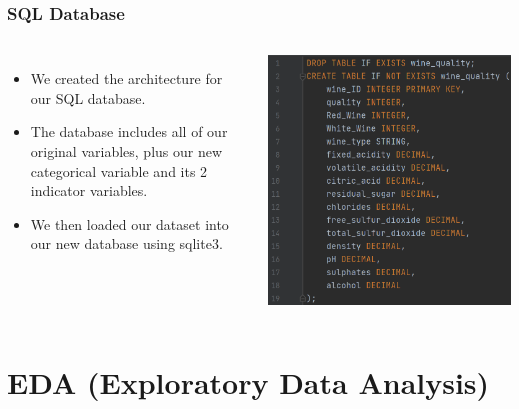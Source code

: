 \documentclass{beamer}
\begin{document}
		\begin{frame}
			\frametitle{SQL Database}
				\begin{columns}
						\begin{itemize}
							\item We created the architecture for our SQL database.
							\item The database includes all of our original variables, plus our new categorical variable and its 2 indicator variables.
							\item We then loaded our dataset into our new database using sqlite3.
						\end{itemize}
					
						\includegraphics[height=.85\textheight]{images/sql.png}
				\end{columns}

		
		\end{frame}
	
	
	\section{EDA (Exploratory Data Analysis)}
	
\end{document}
